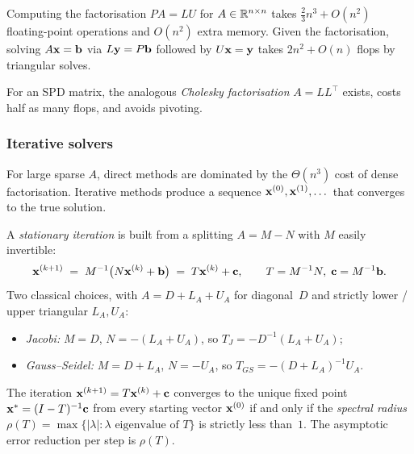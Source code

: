 \begin{theorem}
\label{thm:lu-cost}
Computing the factorisation $P A = L U$ for $A \in \mathbb{R}^{n \times n}$
takes $\tfrac{2}{3} n^3 + O(n^2)$ floating-point operations and
$O(n^2)$ extra memory. Given the factorisation, solving
$A \mathbf{x} = \mathbf{b}$ via $L \mathbf{y} = P \mathbf{b}$ followed by
$U \mathbf{x} = \mathbf{y}$ takes $2 n^2 + O(n)$ flops by triangular
solves.
\end{theorem}

For an SPD matrix, the analogous \emph{Cholesky factorisation}
$A = L L^\top$ exists, costs half as many flops, and avoids pivoting.

\subsubsection*{Iterative solvers}

For large sparse $A$, direct methods are dominated by the
$\Theta(n^3)$ cost of dense factorisation. Iterative methods produce
a sequence $\mathbf{x}^{(0)}, \mathbf{x}^{(1)}, \dots$ that converges to
the true solution.

A \emph{stationary iteration} is built from a splitting $A = M - N$
with $M$ easily invertible:
\[
  \mathbf{x}^{(k+1)} \;=\; M^{-1} \bigl(N \mathbf{x}^{(k)} + \mathbf{b}\bigr)
                      \;=\; T \mathbf{x}^{(k)} + \mathbf{c},
  \qquad T = M^{-1} N, \;\mathbf{c} = M^{-1} \mathbf{b}.
\]
Two classical choices, with $A = D + L_A + U_A$ for diagonal~$D$ and
strictly lower / upper triangular $L_A, U_A$:
\begin{itemize}
  \item \emph{Jacobi:} $M = D$, $N = -(L_A + U_A)$, so
        $T_J = -D^{-1}(L_A + U_A)$;
  \item \emph{Gauss--Seidel:} $M = D + L_A$, $N = -U_A$, so
        $T_{GS} = -(D + L_A)^{-1} U_A$.
\end{itemize}

\begin{theorem}
\label{thm:stationary-convergence}
The iteration $\mathbf{x}^{(k+1)} = T \mathbf{x}^{(k)} + \mathbf{c}$
converges to the unique fixed point $\mathbf{x}^* = (I - T)^{-1} \mathbf{c}$
from every starting vector $\mathbf{x}^{(0)}$ if and only if the
\emph{spectral radius} $\rho(T) = \max\{|\lambda| : \lambda \text{ eigenvalue of } T\}$
is strictly less than~$1$. The asymptotic error reduction per step
is $\rho(T)$.
\end{theorem}

